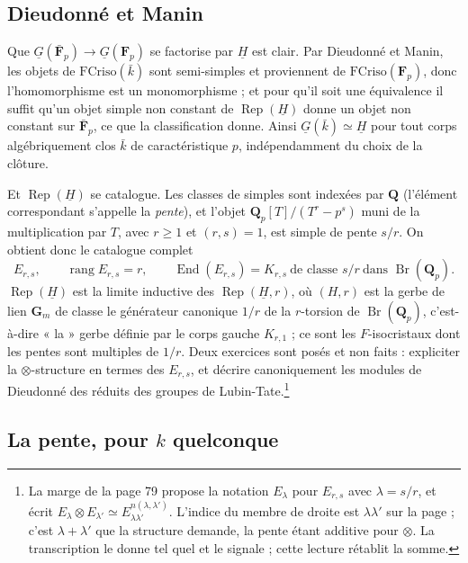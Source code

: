 \documentclass[11pt,a4paper]{article}
\begin{document}
\subsection*{Dieudonné et Manin}

Que $\underline{G}(\bar{\mathbf{F}}_{p}) \to \underline{G}(\mathbf{F}_{p})$ se
factorise par $\underline{H}$ est clair. Par Dieudonné et Manin, les objets de
$\mathrm{FCriso}(\bar{k})$ sont semi-simples et proviennent de
$\mathrm{FCriso}(\mathbf{F}_{p})$, donc l'homomorphisme est un monomorphisme ;
et pour qu'il soit une équivalence il suffit qu'un objet simple non constant de
$\operatorname{Rep}(\underline{H})$ donne un objet non constant sur
$\bar{\mathbf{F}}_{p}$, ce que la classification donne. Ainsi
$\underline{G}(\bar{k}) \simeq \underline{H}$ pour tout corps
algébriquement clos $\bar{k}$ de caractéristique $p$, indépendamment du choix
de la clôture.

Et $\operatorname{Rep}(\underline{H})$ se catalogue. Les classes de simples
sont indexées par $\mathbf{Q}$ (l'élément correspondant s'appelle la
\emph{pente}), et l'objet $\mathbf{Q}_{p}[T]/(T^{r} - p^{s})$ muni de la
multiplication par $T$, avec $r \geqslant 1$ et $(r,s) = 1$, est simple de
pente $s/r$. On obtient donc le catalogue complet
\[
E_{r,s} , \qquad \operatorname{rang} E_{r,s} = r ,
\qquad \operatorname{End}(E_{r,s}) = K_{r,s}
\ \text{de classe } s/r \ \text{dans } \operatorname{Br}(\mathbf{Q}_{p}) .
\]
$\operatorname{Rep}(\underline{H})$ est la limite inductive des
$\operatorname{Rep}(\underline{H}, r)$, où $(H,r)$ est la gerbe de lien
$\mathbf{G}_{m}$ de classe le générateur canonique $1/r$ de la $r$-torsion de
$\operatorname{Br}(\mathbf{Q}_{p})$, c'est-à-dire « la » gerbe définie par le
corps gauche $K_{r,1}$ ; ce sont les $F$-isocristaux dont les pentes sont
multiples de $1/r$. Deux exercices sont posés et non faits : expliciter la
$\otimes$-structure en termes des $E_{r,s}$, et décrire canoniquement les
modules de Dieudonné des réduits des groupes de Lubin-Tate.\footnote{La marge
de la page 79 propose la notation $E_{\lambda}$ pour $E_{r,s}$ avec $\lambda =
s/r$, et écrit $E_{\lambda} \otimes E_{\lambda'} \simeq
E_{\lambda\lambda'}^{n(\lambda,\lambda')}$. L'indice du membre de droite est
$\lambda\lambda'$ sur la page ; c'est $\lambda + \lambda'$ que la structure
demande, la pente étant additive pour $\otimes$. La transcription le donne tel
quel et le signale ; cette lecture rétablit la somme.}

\subsection*{La pente, pour $k$ quelconque}
\end{document}
